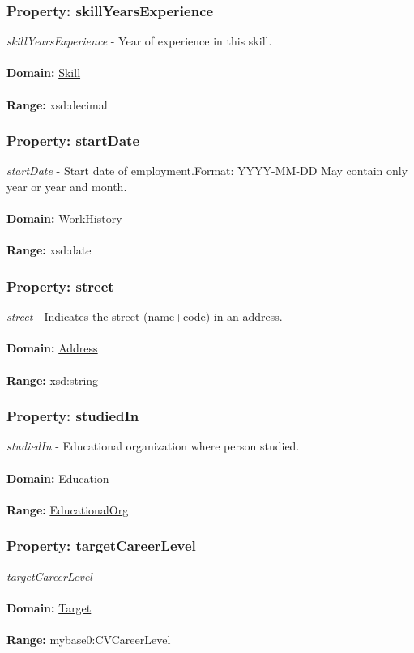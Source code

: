 \documentclass[a4paper,12pt]{article}
\numberwithin{equation}{section}
\begin{document}
\subsubsection{Property: skillYearsExperience}\hypertarget{skillYearsExperience}{}
\textit{skillYearsExperience} - Year of experience in this skill.
\\\\
\textbf{Domain:} \hyperlink{Skill}{Skill} 
\\\\
\textbf{Range:}  xsd:decimal

\subsubsection{Property: startDate}\hypertarget{startDate}{}
\textit{startDate} - Start date of employment.Format: YYYY-MM-DD May contain only year or year and month.
\\\\
\textbf{Domain:} \hyperlink{WorkHistory}{WorkHistory} 
\\\\
\textbf{Range:}  xsd:date

\subsubsection{Property: street}\hypertarget{street}{}
\textit{street} - Indicates the street (name+code) in an address.
\\\\
\textbf{Domain:} \hyperlink{Address}{Address} 
\\\\
\textbf{Range:}  xsd:string

\subsubsection{Property: studiedIn}\hypertarget{studiedIn}{}
\textit{studiedIn} - Educational organization where person studied.
\\\\
\textbf{Domain:} \hyperlink{Education}{Education} 
\\\\
\textbf{Range:}  \hyperlink{EducationalOrg}{EducationalOrg} 

\subsubsection{Property: targetCareerLevel}\hypertarget{targetCareerLevel}{}
\textit{targetCareerLevel} - 
\\\\
\textbf{Domain:} \hyperlink{Target}{Target} 
\\\\
\textbf{Range:}  mybase0:CVCareerLevel 
\end{document}
